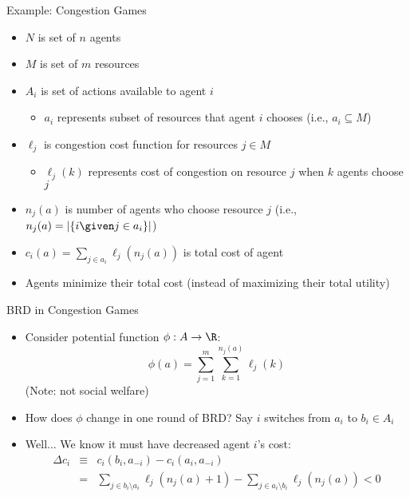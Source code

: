 \documentclass[11pt,aspectratio=169,handout]{beamer}
\begin{document}
  
  \begin{frame}{Example: Congestion Games}
   \begin{itemize}[<+->]
   \setlength{\itemsep}{0.7em}
    \item $N$ is set of $n$ agents
    \item $M$ is set of $m$ \alert{resources}
    \item $A_i$ is set of actions available to agent $i$
    \begin{itemize}
     \item $a_i$ represents subset of resources that agent $i$ chooses (i.e., $a_i \subseteq M$)
    \end{itemize}
    \item $\ell_j$ is \alert{congestion cost function} for resources $j \in M$
    \begin{itemize}
     \item $\ell_j(k)$ represents cost of congestion on resource $j$ when $k$ agents choose $j$
    \end{itemize}
    \item $n_j(a)$ is number of agents who choose resource $j$ (i.e., $n_j(a) = \vert\{i \given j \in a_i\}\vert$)
    \item $c_i(a) = \sum_{j \in a_i} \ell_j(n_j(a))$ is total cost of agent
    \item Agents minimize their total cost (instead of maximizing their total utility)
   \end{itemize}
  \end{frame}
  
  
  \begin{frame}{BRD in Congestion Games}
   \begin{itemize}
    \item<1-> Consider \alert{potential function}  $\phi:A\rightarrow \R$:
    \[\phi(a) = \sum_{j=1}^m \sum_{k=1}^{n_j(a)} \ell_j(k)\]
    (Note: \alert{not} social welfare)
    \item<2-> How does $\phi$ change in one round of BRD? Say $i$ switches from $a_i$ to $b_i \in A_i$
    \item<3->Well... We know it must have decreased agent $i$'s cost:
    \begin{eqnarray*}
     \Delta c_i & \equiv & c_i(b_i, a_{-i}) - c_i(a_i, a_{-i}) \\ 
     & = & \sum_{j \in b_i\setminus a_i}\ell_j(n_j(a)+1) - \sum_{j \in a_i \setminus b_i}\ell_j(n_j(a)) < 0
    \end{eqnarray*}
   \end{itemize}
  \end{frame}
  
\end{document}
